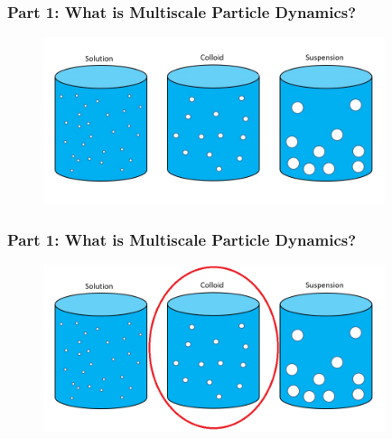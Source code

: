 \documentclass[aspectratio=169,xcolor=dvipsnames]{beamer}
\begin{document}
\begin{frame}
\begin{columns}
	\end{columns}
\end{frame}
\begin{frame}
	\frametitle{Part 1: What is Multiscale Particle Dynamics?}
	
	\begin{figure}
		\includegraphics[width=10cm]{Particles1.jpg}
	\end{figure}
	
\end{frame}

\begin{frame}
	\frametitle{Part 1: What is Multiscale Particle Dynamics?}
	
	\begin{figure}
		\includegraphics[width=10cm]{Particles2.png}
	\end{figure}

\end{frame}
\end{document}
